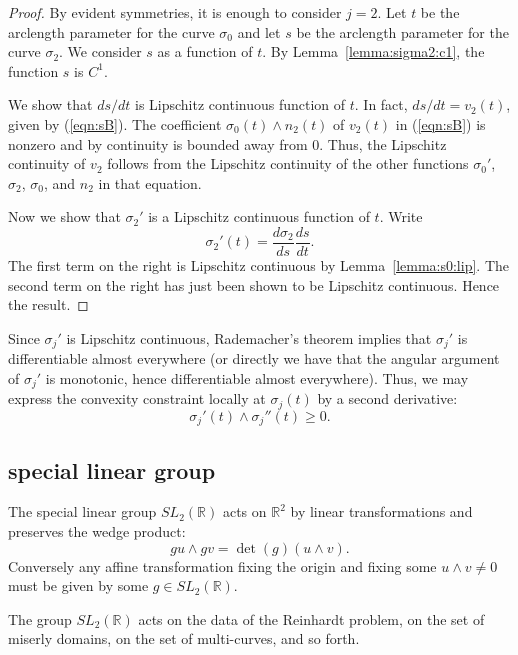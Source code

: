 \documentclass[11pt]{amsart}
\newcommand{\ring}[1]{\mathbb{#1}}
\begin{document}
\begin{proof}
  By evident symmetries, it is enough to consider $j=2$.  Let $t$ be
  the arclength parameter for the curve $\sigma_0$ and let $s$ be the
  arclength parameter for the curve $\sigma_2$. We consider $s$ as a
  function of $t$.  By Lemma~\ref{lemma:sigma2:c1}, the function $s$
  is $C^1$.

We show that $ds/dt$ is Lipschitz continuous function of $t$.  In
fact, $ds/dt=v_2(t)$, given by (\ref{eqn:sB}).  The coefficient
$\sigma_0(t)\land n_2(t)$ of $v_2(t)$ in (\ref{eqn:sB}) is nonzero and
by continuity is bounded away from $0$.  Thus, the Lipschitz
continuity of $v_2$ follows from the Lipschitz continuity of the other
functions $\sigma_0'$, $\sigma_2$, $\sigma_0$, and $n_2$ in that
equation.

Now we show that $\sigma_2'$ is a Lipschitz continuous function of $t$.
Write
\[
\sigma_2'(t) = \frac{d\sigma_2}{d s} \frac{ds}{dt}.
\]
The first term on the right is Lipschitz continuous by Lemma~\ref{lemma:s0:lip}.  The
second term on the right has just been shown to be Lipschitz continuous.  Hence the result.
\end{proof}

Since $\sigma_j'$ is Lipschitz continuous, Rademacher's theorem
implies that $\sigma_j'$ is differentiable almost everywhere (or
directly we have that the angular argument of $\sigma_j'$ is
monotonic, hence differentiable almost everywhere).  Thus, we may
express the convexity constraint locally at $\sigma_j(t)$ by a second
derivative:
\begin{equation}\label{eqn:curvature''}
\sigma_j'(t)\land \sigma_j''(t) \ge 0.
\end{equation}



\subsection{special linear group}


The special linear group
$SL_2(\ring{R})$ acts on $\ring{R}^2$ by linear transformations and preserves the
wedge product:
\[
    {g u}\land{ g v}= \det(g)({u\land v}) .
\]
Conversely any affine transformation fixing the origin and fixing some
${u}\land{v}\ne 0$ must be given by some $g\in SL_2(\ring{R})$.

The group $SL_2(\ring{R})$ acts on the data of the Reinhardt problem,
on the set of miserly domains, on the set of multi-curves, and so
forth.
\end{document}
